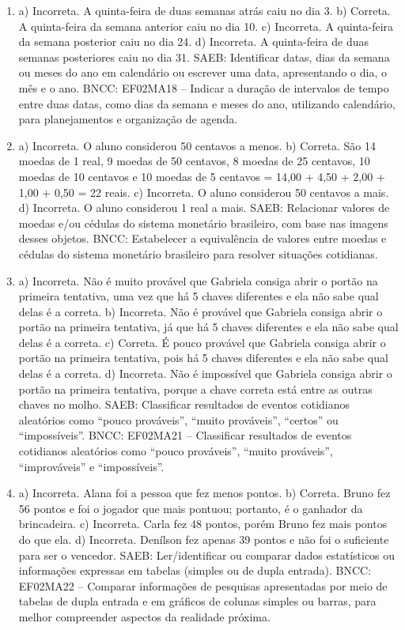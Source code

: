 \begin{enumerate}
\item
a) Incorreta. A quinta-feira de duas semanas atrás caiu no dia 3.
b) Correta. A quinta-feira da semana anterior caiu no dia 10.
c) Incorreta. A quinta-feira da semana posterior caiu no dia 24.
d) Incorreta. A quinta-feira de duas semanas posteriores caiu no dia 31.
SAEB: Identificar datas, dias da semana ou meses do ano em
calendário ou escrever uma data, apresentando o dia, o mês e o ano.
BNCC: EF02MA18 -- Indicar a duração de intervalos de tempo entre duas
datas, como dias da semana e meses do ano, utilizando calendário, para
planejamentos e organização de agenda.

\item
a) Incorreta. O aluno considerou 50 centavos a menos.
b) Correta. São 14 moedas de 1 real, 9 moedas de 50 centavos, 8 moedas
de 25 centavos, 10 moedas de 10 centavos e 10 moedas de 5 centavos =
14,00 + 4,50 + 2,00 + 1,00 + 0,50 = 22 reais.
c) Incorreta. O aluno considerou 50 centavos a mais.
d) Incorreta. O aluno considerou 1 real a mais.
SAEB: Relacionar valores de moedas e/ou cédulas do sistema
monetário brasileiro, com base nas imagens desses objetos.
BNCC: Estabelecer a equivalência de valores entre moedas e
cédulas do sistema monetário brasileiro para resolver situações
cotidianas.

\item
a) Incorreta. Não é muito provável que Gabriela consiga abrir o portão
na primeira tentativa, uma vez que há 5 chaves diferentes e ela não sabe
qual delas é a correta.
b) Incorreta. Não é provável que Gabriela consiga abrir o portão na
primeira tentativa, já que há 5 chaves diferentes e ela não sabe qual
delas é a correta.
c) Correta. É pouco provável que Gabriela consiga abrir o portão na
primeira tentativa, pois há 5 chaves diferentes e ela não sabe qual
delas é a correta.
d) Incorreta. Não é impossível que Gabriela consiga abrir o portão na
primeira tentativa, porque a chave correta está entre as outras chaves
no molho.
SAEB: Classificar resultados de eventos cotidianos aleatórios
como ``pouco prováveis'', ``muito prováveis'', ``certos'' ou
``impossíveis''.
BNCC: EF02MA21 -- Classificar resultados de eventos cotidianos aleatórios
como ``pouco prováveis'', ``muito prováveis'', ``improváveis'' e ``impossíveis''.

\item
a) Incorreta. Alana foi a pessoa que fez menos pontos.
b) Correta. Bruno fez 56 pontos e foi o jogador que mais pontuou;
portanto, é o ganhador da brincadeira.
c) Incorreta. Carla fez 48 pontos, porém Bruno fez mais pontos do que ela.
d) Incorreta. Denílson fez apenas 39 pontos e não foi o suficiente para ser o vencedor.
SAEB: Ler/identificar ou comparar dados estatísticos ou
informações expressas em tabelas (simples ou de dupla entrada).
BNCC: EF02MA22 -- Comparar informações de pesquisas apresentadas por meio
de tabelas de dupla entrada e em gráficos de colunas simples ou barras,
para melhor compreender aspectos da realidade próxima.


\end{enumerate}
